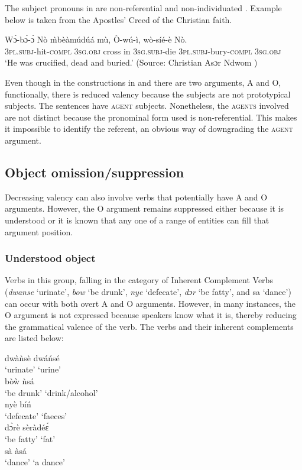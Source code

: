\documentclass[output=paper]{langsci/langscibook}
\begin{document}
The subject pronouns in  are non-referential and non-individuated \citep{hopperthompson1980}. Example  below is taken from the Apostles' Creed of the Christian faith. 

\ea
\label{ex:36.osam}
\gll Wɔ̀-bɔ́-ɔ̀       Nò    \`{m}bèàmúdúá  mù, Ò-wú-ì,     wò-síé-è     Nò.\\
     \textsc{3pl.subj}-hit\textsc{-compl}  \textsc{3sg.obj}  cross in \textsc{3sg.subj}-die  \textsc{3pl.subj}-bury\textsc{-compl}  \textsc{3sg.obj}\\
\glt `He was crucified, dead and buried.' (Source: Christian Asɔr Ndwom \citep{methodist1937})
\z

Even though in the constructions in  and  there are two arguments, A and O, functionally, there is reduced valency because the subjects are not prototypical subjects. The sentences have \textsc{agent} subjects. Nonetheless, the \textsc{agents} involved are not distinct because the pronominal form used is non-referential. This makes it impossible to identify the referent, an obvious way of downgrading the \textsc{agent} argument.

\subsection{Object omission/suppression}\label{§4.5:object.osam}

Decreasing valency can also involve verbs that potentially have A and O arguments. However, the O argument remains suppressed either because it is understood or it is known that any one of a range of entities can fill that argument position.

\subsubsection{Understood object}\label{§4.5.1:understood.osam}

Verbs in this group, falling in the category of Inherent Complement Verbs (\textit{dwanse} `urinate', \textit{bow} `be drunk', \textit{nye} `defecate', \textit{dɔr} `be fatty', and sa `dance') can occur with both overt A and O arguments. However, in many instances, the O argument is not expressed because speakers know what it is, thereby reducing the grammatical valence of the verb. The verbs and their inherent complements are listed below:

\ea\label{ex:37.osam}
\ea\label{ex:37a.osam}
\gll  dwàǹsè   dwáńsé\\
   `urinate'  `urine' \\
\ex\label{ex:37b.osam}
\gll   bòẁ    ǹsá\\ 
  {`be drunk'}  `drink/alcohol'\\
\ex\label{ex:37c.osam}
\gll   nyè    bíń\\ 
  `defecate'  `faeces' \\
\ex\label{ex:37d.osam}
\gll    dɔ̀rè    sèràdé\'{ɛ}\\
  {`be fatty'}  `fat'  \\
\ex\label{ex:37e.osam}
\gll    sà    àsá\\
   `dance'    {`a dance'}  \\
\z 
\z 
\end{document}
